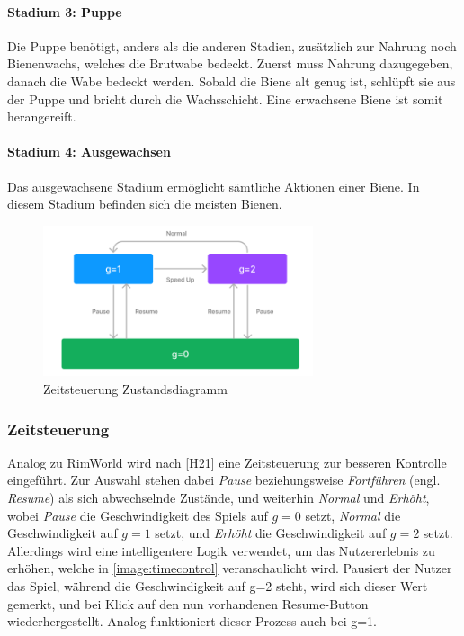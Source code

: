\paragraph{Stadium 3: Puppe} Die Puppe benötigt, anders als die anderen Stadien, zusätzlich zur Nahrung noch Bienenwachs, welches die Brutwabe bedeckt. Zuerst muss Nahrung dazugegeben, danach die Wabe bedeckt werden. Sobald die Biene alt genug ist, schlüpft sie aus der Puppe und bricht durch die Wachsschicht. Eine erwachsene Biene ist somit herangereift.

\paragraph{Stadium 4: Ausgewachsen} Das ausgewachsene Stadium ermöglicht sämtliche Aktionen einer Biene. In diesem Stadium befinden sich die meisten Bienen. 

\begin{figure}
    \begin{center}
        \includegraphics[width=300px]{0.bilder/timecontrol.png}
    \end{center}
    \caption{Zeitsteuerung Zustandsdiagramm} \label{image:timecontrol}
\end{figure}

\subsubsection{Zeitsteuerung}
Analog zu RimWorld wird nach [H21] eine Zeitsteuerung zur besseren Kontrolle eingeführt. Zur Auswahl stehen dabei \textit{Pause} beziehungsweise \textit{Fortführen} (engl. \textit{Resume}) als sich abwechselnde Zustände, und weiterhin \textit{Normal} und \textit{Erhöht}, wobei \textit{Pause} die Geschwindigkeit des Spiels auf $g=0$ setzt, \textit{Normal} die Geschwindigkeit auf $g=1$ setzt, und \textit{Erhöht} die Geschwindigkeit auf $g=2$ setzt. Allerdings wird eine intelligentere Logik verwendet, um das Nutzererlebnis zu erhöhen, welche in \autoref{image:timecontrol} veranschaulicht wird. Pausiert der Nutzer das Spiel, während die Geschwindigkeit auf g=2 steht, wird sich dieser Wert gemerkt, und bei Klick auf den nun vorhandenen Resume-Button wiederhergestellt. Analog funktioniert dieser Prozess auch bei g=1.

